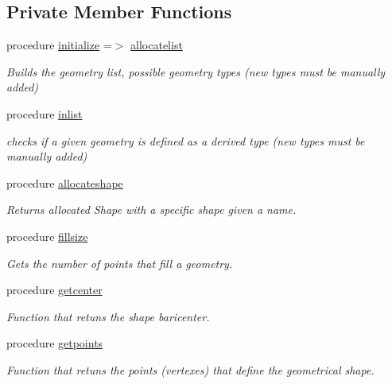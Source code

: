 \subsection*{Private Member Functions}
\begin{DoxyCompactItemize}
\item 
procedure \mbox{\hyperlink{structgeometry__mod_1_1geometry__class_a97a9a90ff4143d41fe57eb0e6d1c76a1}{initialize}} =$>$ \mbox{\hyperlink{namespacegeometry__mod_a1b6f259b0b6be71e02ffae7670f7d8ba}{allocatelist}}
\begin{DoxyCompactList}\small\item\em Builds the geometry list, possible geometry types (new types must be manually added) \end{DoxyCompactList}\item 
procedure \mbox{\hyperlink{structgeometry__mod_1_1geometry__class_a6dfcc19f822da875bebc58c3bf26e999}{inlist}}
\begin{DoxyCompactList}\small\item\em checks if a given geometry is defined as a derived type (new types must be manually added) \end{DoxyCompactList}\item 
procedure \mbox{\hyperlink{structgeometry__mod_1_1geometry__class_a435975f73e28fc8c9f04b47c390cb089}{allocateshape}}
\begin{DoxyCompactList}\small\item\em Returns allocated Shape with a specific shape given a name. \end{DoxyCompactList}\item 
procedure \mbox{\hyperlink{structgeometry__mod_1_1geometry__class_a75f5a37d0b38c8baf66ee5089ea44d7a}{fillsize}}
\begin{DoxyCompactList}\small\item\em Gets the number of points that fill a geometry. \end{DoxyCompactList}\item 
procedure \mbox{\hyperlink{structgeometry__mod_1_1geometry__class_a691891378a677185f2f13e736f68ff11}{getcenter}}
\begin{DoxyCompactList}\small\item\em Function that retuns the shape baricenter. \end{DoxyCompactList}\item 
procedure \mbox{\hyperlink{structgeometry__mod_1_1geometry__class_a4dd64d46f41c5c429a0b2b88250fa04e}{getpoints}}
\begin{DoxyCompactList}\small\item\em Function that retuns the points (vertexes) that define the geometrical shape. \end{DoxyCompactList}\item 

\end{DoxyCompactItemize}
